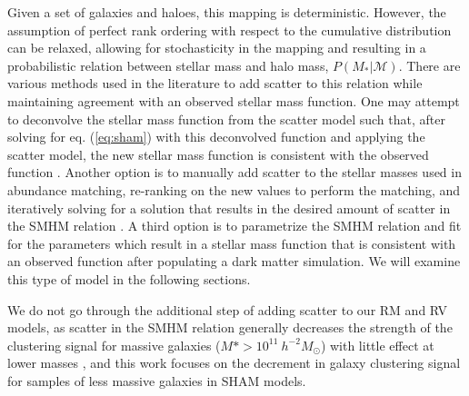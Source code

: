 \documentclass[a4paper,fleqn,usenatbib]{mnras}
\begin{document}
Given a set of galaxies and haloes, this mapping is deterministic.  However, the assumption of perfect rank ordering with respect to the cumulative distribution can be relaxed, allowing for stochasticity in the mapping and resulting in a probabilistic relation between stellar mass and halo mass, $P(M_*|\mathcal{M})$.  There are various methods used in the literature to add scatter to this relation while maintaining agreement with an observed stellar mass function.  One may attempt to deconvolve the stellar mass function from the scatter model such that, after solving for eq. (\ref{eq:sham}) with this deconvolved function and applying the scatter model, the new stellar mass function is consistent with the observed function \citep[e.g.][]{Behroozi:2010ja}.  Another option is to manually add scatter to the stellar masses used in abundance matching, re-ranking on the new values to perform the matching, and iteratively solving for a solution that results in the desired amount of scatter in the SMHM relation \citep[e.g.][]{Hearin:2013ok}.  A third option is to parametrize the SMHM relation and fit for the parameters which result in a stellar mass function that is consistent with an observed function after populating a dark matter simulation.  We will examine this type of model in the following sections.

We do not go through the additional step of adding scatter to our RM and RV models, as scatter in the SMHM relation generally decreases the strength of the clustering signal for massive galaxies ($M* > 10^{11} ~h^{-2} M_{\odot}$) with little effect at lower masses \citep{Tinker:2016vu}, and this work focuses on the decrement in galaxy clustering signal for samples of less massive galaxies in SHAM models.

\end{document}
